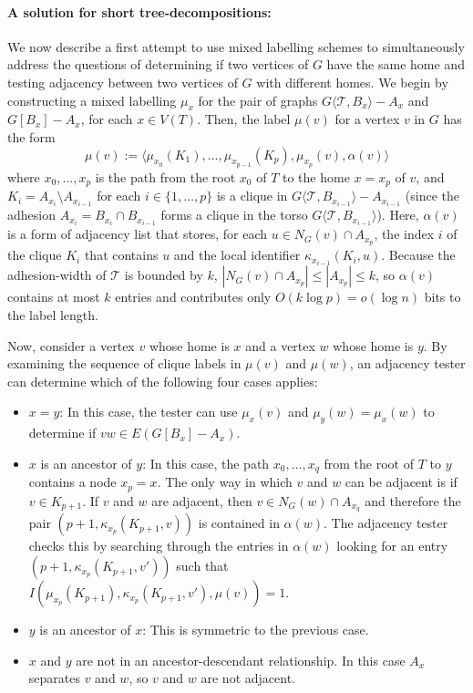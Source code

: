\documentclass[twoside,leqno]{article}
\renewcommand{\le}{\leqslant}
\newcommand{\torso}[2]{{#1}\langle{#2}\rangle}
\newcommand{\Oh}{O}
\begin{document}
\paragraph{A solution for short tree-decompositions:}
We now describe a first attempt to use mixed labelling schemes to simultaneously address the questions of determining if two vertices of $G$ have the same home and testing adjacency between two vertices of $G$ with different homes.  We begin by constructing a mixed labelling $\mu_x$ for the pair of graphs $\torso{G}{\mathcal{T},B_x}-A_x$ and $G[B_x]-A_x$, for each $x\in V(T)$.  Then, the label $\mu(v)$ for a vertex $v$ in $G$ has the form
\[
  \mu(v):=\langle \mu_{x_0}(K_1),\ldots,\mu_{x_{p-1}}(K_p),\mu_{x_p}(v),\alpha(v)\rangle
\]
where $x_0,\ldots,x_p$ is the path from the root $x_0$ of $T$ to the home $x=x_p$ of $v$, and $K_i=A_{x_i}\setminus A_{x_{i-1}}$ for each $i\in\{1,\ldots,p\}$ is a clique in $\torso{G}{\mathcal{T},B_{x_{i-1}}}-A_{x_{i-1}}$ (since the adhesion $A_{x_i}=B_{x_i}\cap B_{x_{i-1}}$ forms a clique in the torso $\torso{G}{\mathcal{T},B_{x_{i-1}}}$).  Here, $\alpha(v)$ is a form of adjacency list that stores, for each $u\in N_G(v)\cap A_{x_p}$, the index $i$ of the clique $K_i$ that contains $u$ and the local identifier $\kappa_{x_{i-1}}(K_i,u)$. Because the adhesion-width of $\mathcal{T}$ is bounded by $k$, $|N_G(v)\cap A_{x_p}|\le |A_{x_p}|\le k$, so $\alpha(v)$ contains at most $k$ entries and contributes only $\Oh(k\log p)=o(\log n)$ bits to the label length.

Now, consider a vertex $v$ whose home is $x$ and a vertex $w$ whose home is $y$.  By examining the sequence of clique labels in $\mu(v)$ and $\mu(w)$, an adjacency tester can determine which of the following four cases applies:
\begin{itemize}[nosep,nolistsep]
  \item $x=y$: In this case, the tester can use $\mu_x(v)$ and $\mu_y(w)=\mu_x(w)$ to determine if $vw\in E(G[B_x]-A_x)$.
  \item $x$ is an ancestor of $y$:  In this case, the path $x_0,\ldots,x_q$ from the root of $T$ to $y$ contains a node $x_p=x$.  The only way in which $v$ and $w$ can be adjacent is if $v\in K_{p+1}$.  If $v$ and $w$ are adjacent, then $v\in N_G(w)\cap A_{x_q}$ and therefore the pair $(p+1,\kappa_{x_p}(K_{p+1}, v))$ is contained in $\alpha(w)$. The adjacency tester checks this by searching through the entries in $\alpha(w)$ looking for an entry $(p+1,\kappa_{x_p}(K_{p+1}, v'))$ such that $I(\mu_{x_p}(K_{p+1}),\kappa_{x_p}(K_{p+1},v'),\mu(v))=1$.
  \item $y$ is an ancestor of $x$: This is symmetric to the previous case.
  \item $x$ and $y$ are not in an ancestor-descendant relationship.  In this case $A_x$ separates $v$ and $w$, so $v$ and $w$ are not adjacent.
\end{itemize}
\end{document}
